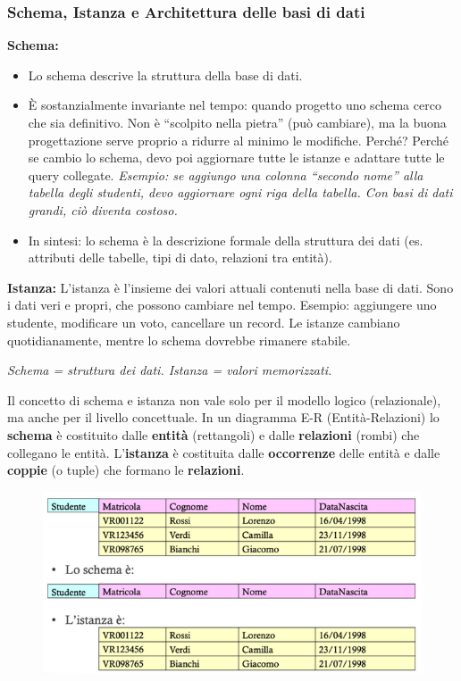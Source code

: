 \documentclass{article}
\begin{document}
\subsubsection{Schema, Istanza e Architettura delle basi di dati}
\textbf{Schema: }\begin{itemize}
    \item Lo schema descrive la struttura della base di dati.
    \item È sostanzialmente invariante nel tempo: quando progetto uno schema cerco che sia definitivo. Non è “scolpito nella pietra” (può cambiare), ma la buona progettazione serve proprio a ridurre al minimo le modifiche. Perché? Perché se cambio lo schema, devo poi aggiornare tutte le istanze e adattare tutte le query collegate. \textit{Esempio: se aggiungo una colonna “secondo nome” alla tabella degli studenti, devo aggiornare ogni riga della tabella. Con basi di dati grandi, ciò diventa costoso.}
\item In sintesi: lo schema è la descrizione formale della struttura dei dati (es. attributi delle tabelle, tipi di dato, relazioni tra entità).
\end{itemize}
\textbf{Istanza:} L'istanza è l'insieme dei valori attuali contenuti nella base di
dati. Sono i dati veri e propri, che possono cambiare nel tempo. Esempio: aggiungere uno studente, modificare un voto, cancellare un record. Le istanze cambiano quotidianamente, mentre lo schema
dovrebbe rimanere stabile. 

\emph{Schema = struttura dei dati. Istanza = valori memorizzati.}

Il concetto di schema e istanza non vale solo per il modello logico (relazionale), ma anche per il livello concettuale. In un diagramma E-R (Entità-Relazioni) lo \textbf{schema} è costituito dalle \textbf{entità} (rettangoli) e dalle \textbf{relazioni} (rombi) che collegano le entità. L’\textbf{istanza} è costituita dalle \textbf{occorrenze} delle entità e dalle \textbf{coppie} (o tuple) che formano le \textbf{relazioni}.

\begin{figure}[h!]
    \centering
    \includegraphics[width=0.5\linewidth]{immagine.png}
\end{figure}
\end{document}
